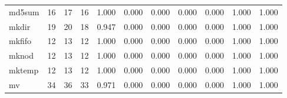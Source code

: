 \begin{longtable}{lp{1.2cm}p{1.2cm}p{1.2cm}p{1.2cm}p{1.2cm}p{1.2cm}p{1.2cm}p{1.2cm}p{1.2cm}p{1.2cm}}
md5sum    &                           16 &                 17 &                                16 &                                      1.000 &                                  0.000 &                                        0.000 &                             0.000 &                                   0.000 &                              1.000 &                                              1.000 \\
mkdir     &                           19 &                 20 &                                18 &                                      0.947 &                                  0.000 &                                        0.000 &                             0.000 &                                   0.000 &                              1.000 &                                              1.000 \\
mkfifo    &                           12 &                 13 &                                12 &                                      1.000 &                                  0.000 &                                        0.000 &                             0.000 &                                   0.000 &                              1.000 &                                              1.000 \\
mknod     &                           12 &                 13 &                                12 &                                      1.000 &                                  0.000 &                                        0.000 &                             0.000 &                                   0.000 &                              1.000 &                                              1.000 \\
mktemp    &                           12 &                 13 &                                12 &                                      1.000 &                                  0.000 &                                        0.000 &                             0.000 &                                   0.000 &                              1.000 &                                              1.000 \\
mv        &                           34 &                 36 &                                33 &                                      0.971 &                                  0.000 &                                        0.000 &                             0.000 &                                   0.000 &                              1.000 &                                              1.000 \\

\end{longtable}
